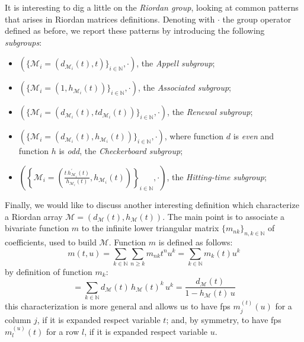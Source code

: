 It 
is interesting to dig a little on the \emph{Riordan group}, looking at
common patterns that arises in Riordan matrices definitions. Denoting with
$\cdot$ the group operator defined as before, we report
these patterns by introducing the following \emph{subgroups}:
\begin{itemize}
    \item $\left(\lbrace \mathcal{M}_{i}=(d_{\mathcal{M}_{i}}(t),t)
        \rbrace_{i\in\mathbb{N}},\cdot\right)$, the \emph{Appell subgroup};
    \item $\left(\lbrace \mathcal{M}_{i}=(1,h_{\mathcal{M}_{i}}(t))
        \rbrace_{i\in\mathbb{N}},\cdot\right)$, the \emph{Associated subgroup};
    \item $\left(\lbrace \mathcal{M}_{i}=(d_{\mathcal{M}_{i}}(t),td_{\mathcal{M}_{i}}(t))
        \rbrace_{i\in\mathbb{N}},\cdot\right)$, the \emph{Renewal subgroup};
    \item $\left(\lbrace \mathcal{M}_{i}=(d_{\mathcal{M}_{i}}(t),h_{\mathcal{M}_{i}}(t))
        \rbrace_{i\in\mathbb{N}},\cdot\right)$, where function $d$ is \emph{even} and 
        function $h$ is \emph{odd}, the \emph{Checkerboard subgroup};
    \item $\left(\left\lbrace \mathcal{M}_{i}=\left(\frac{t\,h_{\mathcal{M}_{i}}^{\prime}(t)}
            {h_{\mathcal{M}_{i}}(t)},h_{\mathcal{M}_{i}}(t)\right)
        \right\rbrace_{i\in\mathbb{N}},\cdot\right)$, the \emph{Hitting-time subgroup};
\end{itemize}

Finally, 
we would like to discuss another interesting definition which characterize
a Riordan array $\mathcal{M}=(d_{\mathcal{M}}(t),h_{\mathcal{M}}(t))$. 
The main point is to associate a bivariate function $m$ 
to the infinite lower triangular matrix $\lbrace m_{nk}\rbrace_{n,k\in\mathbb{N}}$
of coefficients, used to build $\mathcal{M}$. Function $m$ is defined as follows:
\begin{displaymath}
    m(t,u) = \sum_{k\in\mathbb{N}}{\sum_{n\geq k}{m_{nk} t^{n} u^{k}}}
        = \sum_{k\in\mathbb{N}}{m_{k}(t)u^{k}}
\end{displaymath}
by definition of function $m_{k}$:
\begin{displaymath}
    = \sum_{k\in\mathbb{N}}{d_{\mathcal{M}}(t)\,h_{\mathcal{M}}(t)^{k}\,u^{k}}
    = \frac{d_{\mathcal{M}}(t)}{1-h_{\mathcal{M}}(t)\,u}
\end{displaymath}
this characterization is more general and allows us to have \ac{fps} $m_{j}^{(t)}(u)$
for a column $j$, if it is expanded respect variable $t$; and, by symmetry,
to have \ac{fps} $m_{l}^{(u)}(t)$ for a row $l$, if it is expanded respect variable $u$.









